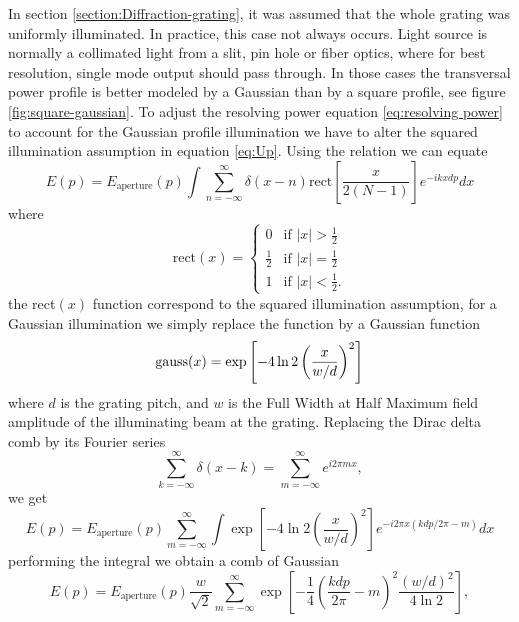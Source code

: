 \documentclass[12pt,twoside,english]{book}
\renewcommand{\~}{\perispomeni}%
\numberwithin{equation}{section}
\numberwithin{figure}{section}
\begin{document}
In section \ref{section:Diffraction-grating}, it was assumed that the whole grating was uniformly illuminated. In practice, this case not always occurs. Light source is normally a collimated light from a slit, pin hole or fiber optics, where for best resolution, single mode output should pass through. In those cases the transversal power profile is better modeled by a Gaussian than by a square profile, see figure \ref{fig:square-gaussian}. To adjust the resolving power equation \ref{eq:resolving power} to account for the Gaussian profile illumination we have to alter the squared illumination assumption in equation \ref{eq:Up}. Using the relation we can equate 
\begin{equation}
E\left(p\right)=E_{\text{aperture}}\left(p\right)\int\sum_{n=-\infty}^{\infty}\delta\left(x-n\right)\text{rect}\left[\frac{x}{2\left(N-1\right)}\right]e^{-ikxdp}dx\end{equation}
where
\begin{equation}
\text{rect}\left(x\right)=\begin{cases}
0 & \mbox{if }\left|x\right|>\frac{1}{2}\\
\frac{1}{2} & \mbox{if }\left|x\right|=\frac{1}{2}\\
1 & \mbox{if }\left|x\right|<\frac{1}{2}.\end{cases}\end{equation}
the rect$\left(x\right)$ function correspond to the squared illumination assumption, for a Gaussian illumination we simply replace the function by a Gaussian function
\begin{equation}
\text{gauss}\mbox{\ensuremath{\left(x\right)}}=\exp\left[-4\ln2\left(\frac{x}{w/d}\right)^{2}\right]\end{equation}
where $d$ is the grating pitch, and $w$ is the Full Width at Half Maximum field amplitude of the illuminating beam at the grating. Replacing the Dirac delta comb by its Fourier series 
\begin{equation}
\sum_{k=-\infty}^{\infty}\delta\left(x-k\right)=\sum_{m=-\infty}^{\infty}e^{i2\pi mx},\end{equation}
we get
\begin{equation}
E\left(p\right)=E_{\text{aperture}}\left(p\right)\sum_{m=-\infty}^{\infty}\int\exp\left[-4\ln2\left(\frac{x}{w/d}\right)^{2}\right]e^{-i2\pi x\left(kdp/2\pi-m\right)}dx\end{equation}
performing the integral we obtain a comb of Gaussian 
\begin{equation}
E\left(p\right)=E_{\text{aperture}}\left(p\right)\frac{w}{\sqrt{2}}\sum_{m=-\infty}^{\infty}\exp\left[-\frac{1}{4}\left(\frac{kdp}{2\pi}-m\right)^{2}\frac{\left(w/d\right)^{2}}{4\ln2}\right],\label{eq:gaussian comb}\end{equation}
\end{document}
